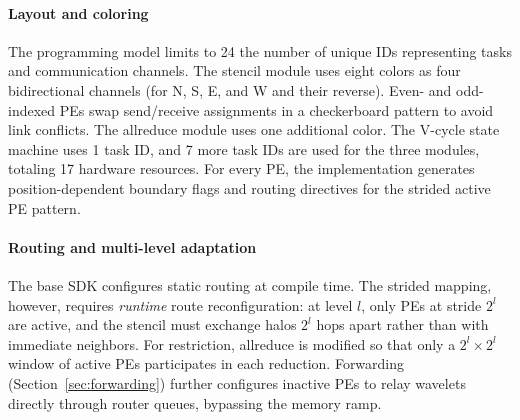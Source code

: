 \documentclass[conference]{IEEEtran}
\begin{document}
            \paragraph{Layout and coloring}
The programming model limits to 24 the number of unique IDs representing tasks and communication channels.
The stencil module uses eight colors
                as four bidirectional channels (for N, S, E, and W and their reverse). %
Even- and odd-indexed PEs swap send/receive assignments in a checkerboard pattern to avoid link
conflicts. The allreduce module uses one additional color. %
The V-cycle state machine uses 1 task ID, and 7 more task IDs are used for the three modules, totaling 17 hardware resources. %
For every PE, the implementation generates
                position-dependent boundary flags and routing directives for the strided active PE pattern. %

            \paragraph{Routing and multi-level adaptation}
                The base SDK configures static routing at compile time. %
                The strided mapping, however, requires \textit{runtime} route reconfiguration: at level $l$, only PEs at stride $2^l$ are active, and the stencil must exchange halos $2^l$ hops apart rather than with immediate neighbors. %
                For restriction, 
                allreduce is modified so that only a $2^l \times 2^l$ window of active PEs participates in each reduction.  Forwarding  (Section~\ref{sec:forwarding}) further configures inactive PEs to relay wavelets directly through router queues, bypassing the memory ramp.
\end{document}
